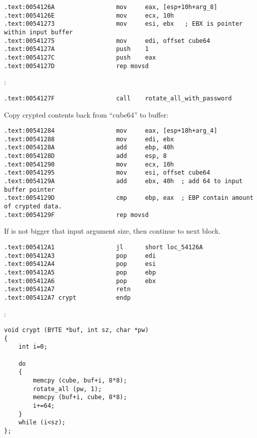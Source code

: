 \begin{lstlisting}
.text:0054126A                 mov     eax, [esp+10h+arg_8]
.text:0054126E                 mov     ecx, 10h
.text:00541273                 mov     esi, ebx   ; EBX is pointer within input buffer
.text:00541275                 mov     edi, offset cube64
.text:0054127A                 push    1
.text:0054127C                 push    eax
.text:0054127D                 rep movsd
\end{lstlisting}

 :

\begin{lstlisting}
.text:0054127F                 call    rotate_all_with_password
\end{lstlisting}

{Copy crypted contents back from ``cube64'' to buffer}:

\begin{lstlisting}
.text:00541284                 mov     eax, [esp+18h+arg_4]
.text:00541288                 mov     edi, ebx
.text:0054128A                 add     ebp, 40h
.text:0054128D                 add     esp, 8
.text:00541290                 mov     ecx, 10h
.text:00541295                 mov     esi, offset cube64
.text:0054129A                 add     ebx, 40h  ; add 64 to input buffer pointer
.text:0054129D                 cmp     ebp, eax  ; EBP contain amount of crypted data.
.text:0054129F                 rep movsd
\end{lstlisting}

{If \EBP is not bigger that input argument size, then continue to next block.}

\begin{lstlisting}
.text:005412A1                 jl      short loc_54126A
.text:005412A3                 pop     edi
.text:005412A4                 pop     esi
.text:005412A5                 pop     ebp
.text:005412A6                 pop     ebx
.text:005412A7                 retn
.text:005412A7 crypt           endp
\end{lstlisting}

:

\begin{lstlisting}
void crypt (BYTE *buf, int sz, char *pw)
{
	int i=0;
	
	do
	{
		memcpy (cube, buf+i, 8*8);
		rotate_all (pw, 1);
		memcpy (buf+i, cube, 8*8);
		i+=64;
	}
	while (i<sz);
};
\end{lstlisting}

